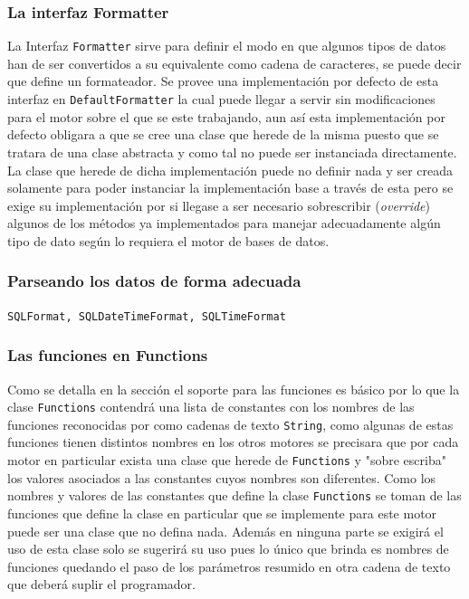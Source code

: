 \subsubsection{La interfaz Formatter}
La Interfaz \verb=Formatter= sirve para definir el modo en que algunos tipos de datos han de ser convertidos a su equivalente como cadena de caracteres, se puede decir que define un formateador. Se provee una implementación por defecto de esta interfaz en \verb=DefaultFormatter= la cual puede llegar a servir sin modificaciones para el motor sobre el que se este trabajando, aun así esta implementación por defecto obligara a que se cree una clase que herede de la misma puesto que se tratara de una clase abstracta y como tal no puede ser instanciada directamente. La clase que herede de dicha implementación puede no definir nada y ser creada solamente para poder instanciar la implementación base a través de esta pero se exige su implementación por si llegase a ser necesario sobrescribir (\textit{override}) algunos de los métodos ya implementados para manejar adecuadamente algún tipo de dato según lo requiera el motor de bases de datos.

\subsubsection{Parseando los datos de forma adecuada}
\verb=SQLFormat, SQLDateTimeFormat, SQLTimeFormat=

\subsubsection{Las funciones  en Functions}
Como se detalla en la sección  el soporte para las funciones es básico por lo que la clase \verb=Functions= contendrá una lista de constantes con los nombres de las funciones reconocidas por \jj como cadenas de texto \verb=String=, como algunas de estas funciones tienen distintos nombres en los otros motores se precisara que por cada motor en particular exista una clase que herede de \verb=Functions= y "sobre escriba" los valores asociados a las constantes cuyos nombres son diferentes. Como los nombres y valores de las constantes que define la clase \verb=Functions= se toman de las funciones que define \s la clase en particular que se implemente para este motor puede ser una clase que no defina nada. Además en ninguna parte se exigirá el uso de esta clase solo se sugerirá su uso pues lo único que brinda es nombres de funciones quedando el paso de los parámetros resumido en otra cadena de texto que deberá suplir el programador.  

